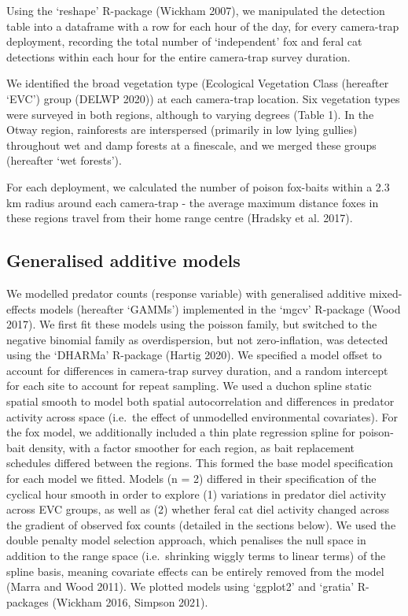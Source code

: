 \documentclass[]{elsarticle} %
\begin{document}
Using the `reshape' R-package (Wickham 2007), we manipulated the detection table into a dataframe with a row for each hour of the day, for every camera-trap deployment, recording the total number of `independent' fox and feral cat detections within each hour for the entire camera-trap survey duration.

We identified the broad vegetation type (Ecological Vegetation Class (hereafter `EVC') group (DELWP 2020)) at each camera-trap location. Six vegetation types were surveyed in both regions, although to varying degrees (Table 1). In the Otway region, rainforests are interspersed (primarily in low lying gullies) throughout wet and damp forests at a finescale, and we merged these groups (hereafter `wet forests').

For each deployment, we calculated the number of poison fox-baits within a 2.3 km radius around each camera-trap - the average maximum distance foxes in these regions travel from their home range centre (Hradsky et al. 2017).

\hypertarget{generalised-additive-models}{%
\subsection{Generalised additive models}\label{generalised-additive-models}}

We modelled predator counts (response variable) with generalised additive mixed-effects models (hereafter `GAMMs') implemented in the `mgcv' R-package (Wood 2017). We first fit these models using the poisson family, but switched to the negative binomial family as overdispersion, but not zero-inflation, was detected using the `DHARMa' R-package (Hartig 2020). We specified a model offset to account for differences in camera-trap survey duration, and a random intercept for each site to account for repeat sampling. We used a duchon spline static spatial smooth to model both spatial autocorrelation and differences in predator activity across space (i.e.~the effect of unmodelled environmental covariates). For the fox model, we additionally included a thin plate regression spline for poison-bait density, with a factor smoother for each region, as bait replacement schedules differed between the regions. This formed the base model specification for each model we fitted. Models (n = 2) differed in their specification of the cyclical hour smooth in order to explore (1) variations in predator diel activity across EVC groups, as well as (2) whether feral cat diel activity changed across the gradient of observed fox counts (detailed in the sections below). We used the double penalty model selection approach, which penalises the null space in addition to the range space (i.e.~shrinking wiggly terms to linear terms) of the spline basis, meaning covariate effects can be entirely removed from the model (Marra and Wood 2011). We plotted models using `ggplot2' and `gratia' R-packages (Wickham 2016, Simpson 2021).
\end{document}

